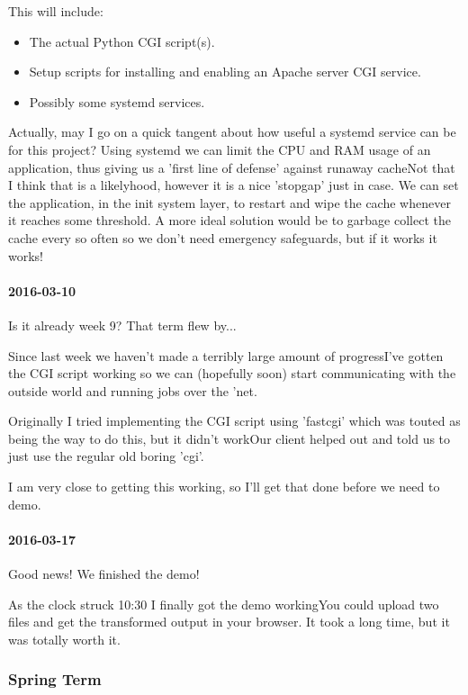 This will include:

\begin{itemize}
  \item The actual Python CGI script(s).
  \item Setup scripts for installing and enabling an Apache server CGI service.
  \item Possibly some systemd services.
\end{itemize}

Actually, may I go on a quick tangent about how useful a systemd service can be for this project? Using systemd we can limit the CPU and RAM usage of an application, thus giving us a 'first line of defense' against runaway cacheNot that I think that is a likelyhood, however it is a nice 'stopgap' just in case.
We can set the application, in the init system layer, to restart and wipe the cache whenever it reaches some threshold.
A more ideal solution would be to garbage collect the cache every so often so we don't need emergency safeguards, but if it works it works!

\paragraph{2016-03-10}

Is it already week 9? That term flew by...

Since last week we haven't made a terribly large amount of progressI've gotten the CGI script working so we can (hopefully soon) start communicating with the outside world and running jobs over the 'net.

Originally I tried implementing the CGI script using 'fastcgi' which was touted as being the way to do this, but it didn't workOur client helped out and told us to just use the regular old boring 'cgi'.

I am very close to getting this working, so I'll get that done before we need to demo.

\paragraph{2016-03-17}

Good news! We finished the demo!

As the clock struck 10:30 I finally got the demo workingYou could upload two files and get the transformed output in your browser.
It took a long time, but it was totally worth it.

\subsubsection{Spring Term}

